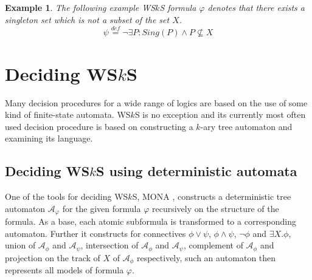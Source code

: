 \documentclass{eeict}
\newtheorem{example}{Example}[section]
\begin{document}
\begin{example} The following example WS$k$S formula $\varphi$ denotes that there
exists a singleton set which is not a subset of the set $X$.
\begin{equation}
 \psi \overset{\mathit{def}}{=} \neg\exists P: Sing(P) \wedge P
 \not\subseteq X
 \label{varphi}
\end{equation}
\end{example}

\section{Deciding WS$k$S}

Many decision procedures for a wide range of logics are based on the use of some
kind of finite-state automata. WS$k$S is no exception and its currently most
often used decision procedure is based on constructing a $k$-ary tree automaton
and examining its language.

\subsection{Deciding WS$k$S using deterministic automata}

One of the tools for deciding WS$k$S, MONA \cite{mona}, constructs a
deterministic tree automaton $\mathcal{A}_\varphi$ for the given formula
$\varphi$ recursively on the structure of the formula. As a base, each atomic
subformula is transformed to a corresponding automaton.
Further it constructs for connectives $\phi \vee
\psi$, $\phi \wedge \psi$, $\neg \phi$ and $\exists X. \phi$, union of
$\mathcal{A}_\phi$ and $\mathcal{A}_\psi$, intersection of $\mathcal{A}_\phi$
and $\mathcal{A}_\psi$, complement of $\mathcal{A}_\phi$ and projection on the
track of $X$ of $\mathcal{A}_\phi$ respectively, such an automaton then
represents all models of formula $\varphi$.
\end{document}
